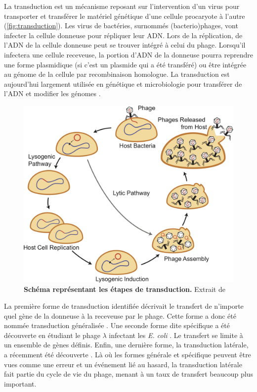 La transduction est un mécanisme reposant sur l'intervention d'un virus pour transporter et transférer le matériel génétique d'une cellule procaryote à l'autre (\autoref{fig:transduction}). Les virus de bactéries, surnommés (bacterio)phages, vont infecter la cellule donneuse pour répliquer leur ADN. Lors de la réplication, de l'ADN de la cellule donneuse peut se trouver intégré à celui du phage. Lorsqu'il infectera une cellule receveuse, la portion d'ADN de la donneuse pourra reprendre une forme plasmidique (si c'est un plasmide qui a été transféré) ou être intégrée au génome de la cellule par recombinaison homologue. La transduction est aujourd'hui largement utilisée en génétique et microbiologie pour transférer de l'ADN et modifier les génomes \cite{wang_phage-based_2024}. 

\begin{figure}[htbp]
    \centering
    \includegraphics[width=0.65\linewidth]{images/transduction.png}
    \caption[Schéma synthétique de la transduction]{\textbf{Schéma représentant les étapes de transduction.} Extrait de \cite{chiang_genetic_2019}}
    \label{fig:transduction}
\end{figure}

La première forme de transduction identifiée décrivait le transfert de n'importe quel gène de la donneuse à la receveuse par le phage. Cette forme a donc été nommée transduction généralisée \cite{zinder_genetic_1952}. Une seconde forme dite spécifique a été découverte en étudiant le phage $\lambda$ infectant les \textit{E. coli} \cite{morse_transduction_1956}. Le transfert se limite à un ensemble de gènes définis. Enfin, une dernière forme, la transduction latérale, a récemment été découverte \cite{chen_genome_2018}. Là où les formes générale et spécifique peuvent être vues comme une erreur et un événement lié au hasard, la transduction latérale fait partie du cycle de vie du phage, menant à un taux de transfert beaucoup plus important. 